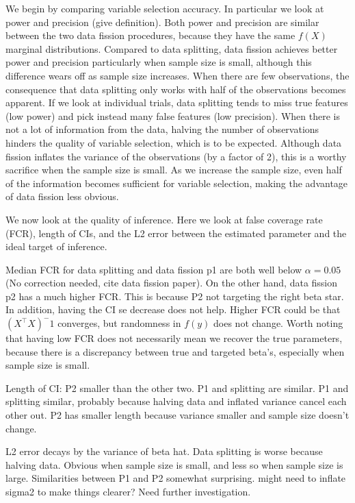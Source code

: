 We begin by comparing variable selection accuracy. In particular we look at power and precision (give definition). Both power and precision are similar between the two data fission procedures, because they have the same $f(X)$ marginal distributions. Compared to data splitting, data fission achieves better power and precision particularly when sample size is small, although this difference wears off as sample size increases. When there are few observations, the consequence that data splitting only works with half of the observations becomes apparent. If we look at individual trials, data splitting tends to miss true features (low power) and pick instead many false features (low precision). When there is not a lot of information from the data, halving the number of observations hinders the quality of variable selection, which is to be expected. Although data fission inflates the variance of the observations (by a factor of 2), this is a worthy sacrifice when the sample size is small. As we increase the sample size, even half of the information becomes sufficient for variable selection, making the advantage of data fission less obvious.

We now look at the quality of inference. Here we look at false coverage rate (FCR), length of CIs, and the L2 error between the estimated parameter and the ideal target of inference.

Median FCR for data splitting and data fission p1 are both well below $\alpha = 0.05$ (No correction needed, cite data fission paper). On the other hand, data fission p2 has a much higher FCR. This is because P2 not targeting the right beta star. In addition, having the CI se decrease does not help. Higher FCR could be that $(X^\top X)^-1$ converges, but randomness in $f(y)$ does not change. Worth noting that having low FCR does not necessarily mean we recover the true parameters, because there is a discrepancy between true and targeted beta's, especially when sample size is small.

Length of CI: P2 smaller than the other two. P1 and splitting are similar. P1 and splitting similar, probably because halving data and inflated variance cancel each other out. P2 has smaller length because variance smaller and sample size doesn't change.

L2 error decays by the variance of beta hat. Data splitting is worse because halving data. Obvious when sample size is small, and less so when sample size is large. Similarities between P1 and P2 somewhat surprising. might need to inflate sigma2 to make things clearer? Need further investigation.

